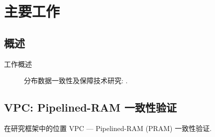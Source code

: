 \section{主要工作}

\subsection{概述}

\begin{frame}{工作概述}

  \begin{figure}[h!]
    \centering
    \begin{adjustbox}{max totalsize = {0.95\textwidth}{0.75\textheight}, center}
      
    \end{adjustbox}
    \caption{分布数据一致性及保障技术研究: 
        .}
  \end{figure}
\end{frame}
\subsection{VPC: Pipelined-RAM 一致性验证}

\begin{frame}{在研究框架中的位置}
  {VPC --- Pipelined-RAM (PRAM) 一致性验证.}
\end{frame}
  

